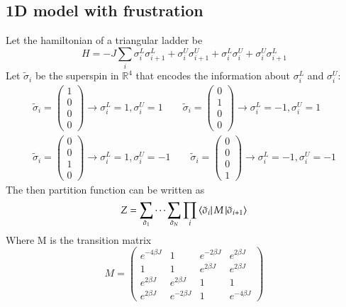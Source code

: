 \documentclass{article}
\newcommand{\R}{\ensuremath{\mathbb{R}}}
\begin{document}
\subsection{1D model with frustration}
Let the hamiltonian of a triangular ladder be
\begin{equation}
    H = -J \sum_i \sigma_i^L \sigma_{i+1}^L + \sigma_i^U \sigma_{i+1}^U + \sigma_i^L \sigma_i^U + \sigma_i^U \sigma_{i+1}^L
\end{equation}
Let $\tilde{\sigma}_i$ be the superspin in $\R^4$ that encodes the information about $\sigma_i^L$ and $\sigma_i^U$:
\begin{equation}
\begin{gathered}
    \tilde{\sigma}_i = \begin{pmatrix} 1 \\ 0 \\ 0 \\ 0 \end{pmatrix} \rightarrow \sigma_i^L = 1, \sigma_i^U = 1
    \qquad
    \tilde{\sigma}_i = \begin{pmatrix} 0 \\ 1 \\ 0 \\ 0 \end{pmatrix} \rightarrow \sigma_i^L = -1, \sigma_i^U = 1
    \\
    \tilde{\sigma}_i = \begin{pmatrix} 0 \\ 0 \\ 1 \\ 0 \end{pmatrix} \rightarrow \sigma_i^L = 1, \sigma_i^U = -1
    \qquad
    \tilde{\sigma}_i = \begin{pmatrix} 0 \\ 0 \\ 0 \\ 1 \end{pmatrix} \rightarrow \sigma_i^L = -1, \sigma_i^U = -1
\end{gathered}
\end{equation}
The then partition function can be written as
\begin{equation}
    Z = \sum_{\tilde{\sigma}_1} \cdots \sum_{\tilde{\sigma}_N} \prod_i \bra{\tilde{\sigma}_i}M\ket{\tilde{\sigma}_{i+1}}
\end{equation}
Where M is the transition matrix
\begin{equation}
    M = \begin{pmatrix}
        e^{-4\beta J} & 1 & e^{-2\beta J} & e^{2\beta J} \\
        1 & 1 & e^{2\beta J} & e^{2\beta J} \\
        e^{2\beta J} & e^{2\beta J} & 1 & 1 \\
        e^{2\beta J} & e^{-2\beta J} & 1 & e^{-4\beta J}
    \end{pmatrix}
\end{equation}
\end{document}
